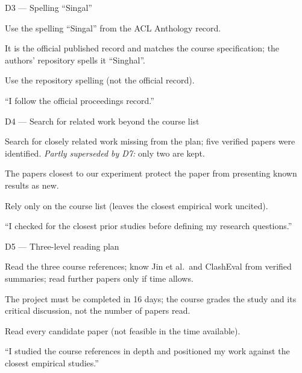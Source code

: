 \documentclass[11pt,a4paper]{report}
\begin{document}
\begin{decisionbox}{D3 --- Spelling ``Singal''}
\begin{description}[nosep, leftmargin=0pt]
  \item[Decision.] Use the spelling ``Singal'' from the ACL Anthology record.
  \item[Why.] It is the official published record and matches the course
    specification; the authors' repository spells it ``Singhal''.
  \item[Alternatives.] Use the repository spelling (not the official record).
  \item[Interview line.] ``I follow the official proceedings record.''
\end{description}
\end{decisionbox}
\begin{decisionbox}{D4 --- Search for related work beyond the course list}
\begin{description}[nosep, leftmargin=0pt]
  \item[Decision.] Search for closely related work missing from the plan;
    five verified papers were identified. \emph{Partly superseded by D7:}
    only two are kept.
  \item[Why.] The papers closest to our experiment protect the paper from
    presenting known results as new.
  \item[Alternatives.] Rely only on the course list (leaves the closest
    empirical work uncited).
  \item[Interview line.] ``I checked for the closest prior studies before
    defining my research questions.''
\end{description}
\end{decisionbox}

\begin{decisionbox}{D5 --- Three-level reading plan}
\begin{description}[nosep, leftmargin=0pt]
  \item[Decision.] Read the three course references; know Jin et al.\ and
    ClashEval from verified summaries; read further papers only if time
    allows.
  \item[Why.] The project must be completed in 16 days; the course grades the
    study and its critical discussion, not the number of papers read.
  \item[Alternatives.] Read every candidate paper (not feasible in the time
    available).
  \item[Interview line.] ``I studied the course references in depth and
    positioned my work against the closest empirical studies.''
\end{description}
\end{decisionbox}
\end{document}
